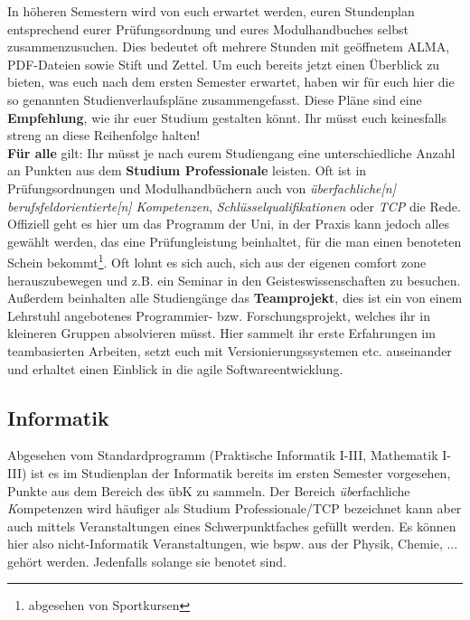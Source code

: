 In höheren Semestern wird von euch erwartet werden, euren Stundenplan
entsprechend eurer Prüfungsordnung und eures Modulhandbuches selbst
zusammenzusuchen. Dies bedeutet oft mehrere Stunden mit geöffnetem ALMA,
PDF-Dateien sowie Stift und Zettel. Um euch bereits jetzt einen Überblick zu
bieten, was euch nach dem ersten Semester erwartet, haben wir für euch hier die
so genannten Studienverlaufspläne zusammengefasst. Diese Pläne sind eine
\textbf{Empfehlung}, wie ihr euer Studium gestalten könnt. Ihr müsst euch
keinesfalls streng an diese Reihenfolge halten! \medskip
\\

\textbf{Für alle} gilt: Ihr müsst je nach eurem Studiengang eine
unterschiedliche Anzahl an Punkten aus dem \textbf{Studium Professionale}
leisten. Oft ist in Prüfungsordnungen und Modulhandbüchern auch von
\emph{überfachliche[n] berufsfeldorientierte[n] Kompetenzen},
\emph{Schlüsselqualifikationen} oder \emph{TCP} die Rede. Offiziell geht es
hier um das Programm der Uni, in der Praxis kann jedoch alles gewählt werden,
das eine Prüfungleistung beinhaltet, für die man einen benoteten Schein
bekommt\footnote{abgesehen von Sportkursen}. Oft lohnt es sich auch, sich aus
der eigenen comfort zone herauszubewegen und z.B. ein Seminar in den
Geisteswissenschaften zu besuchen.\\
Außerdem beinhalten alle Studiengänge das \textbf{Teamprojekt}, dies ist ein
von einem Lehrstuhl angebotenes Programmier- bzw. Forschungsprojekt, welches
ihr in kleineren Gruppen absolvieren müsst. Hier sammelt ihr erste Erfahrungen
im teambasierten Arbeiten, setzt euch mit Versionierungssystemen etc.
auseinander und erhaltet einen Einblick in die agile Softwareentwicklung.
\vfill \pagebreak 



\pagebreak

\subsection*{Informatik}
	
Abgesehen vom Standardprogramm (Praktische Informatik I-III, Mathematik I-III)
ist es im Studienplan der Informatik bereits im ersten Semester vorgesehen,
Punkte aus dem Bereich des übK zu sammeln. Der Bereich \emph{üb}erfachliche
\emph{K}ompetenzen wird häufiger als Studium Professionale/TCP bezeichnet kann
aber auch mittels Veranstaltungen eines Schwerpunktfaches gefüllt werden. Es
können hier also nicht-Informatik Veranstaltungen, wie bspw. aus der Physik,
Chemie, ... gehört werden.  Jedenfalls solange sie benotet sind.

